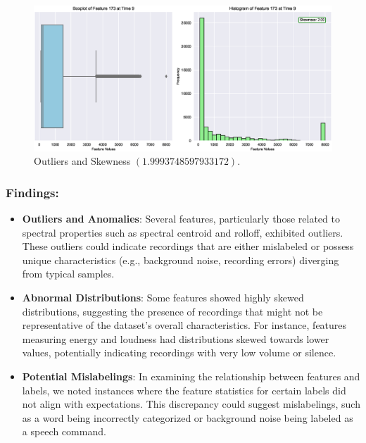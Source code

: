 \begin{figure}[!ht]
	\centering
	\includegraphics[scale=0.3]{fig/boxplot_histogram_skew}
	\vspace{-0.3cm}
	\caption{Outliers and Skewness $(1.9993748597933172)$.}
	\label{fig:Biases}
	\vspace{-0.1cm}
\end{figure}


\subsubsection{Findings:}

\begin{itemize}
    \item \textbf{Outliers and Anomalies}: Several features, particularly those related to spectral properties such as spectral centroid and rolloff, exhibited outliers. These outliers could indicate recordings that are either mislabeled or possess unique characteristics (e.g., background noise, recording errors) diverging from typical samples.
    \item \textbf{Abnormal Distributions}: Some features showed highly skewed distributions, suggesting the presence of recordings that might not be representative of the dataset's overall characteristics. For instance, features measuring energy and loudness had distributions skewed towards lower values, potentially indicating recordings with very low volume or silence.
    \item \textbf{Potential Mislabelings}: In examining the relationship between features and labels, we noted instances where the feature statistics for certain labels did not align with expectations. This discrepancy could suggest mislabelings, such as a word being incorrectly categorized or background noise being labeled as a speech command.
\end{itemize}

